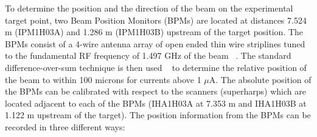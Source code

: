 {To determine the position and the direction of the beam on the experimental 
target point, two Beam Position Monitors (BPMs) are located at distances 7.524 m 
(IPM1H03A) and 1.286 m (IPM1H03B) upstream of the target position. 
The BPMs consist of a 4-wire antenna array of open ended thin wire striplines 
tuned to the fundamental RF frequency of 1.497 GHz of the beam ~\cite{bi:bar90}. The 
standard difference-over-sum technique is then used ~\cite{bi:HW} to determine the 
relative position of the beam to within 100 microns for currents
above 1 $\mu $A. The absolute  position of the BPMs can be calibrated with respect to the 
scanners (superharps) which are located adjacent to each of the BPMs (IHA1H03A 
at 7.353 m and IHA1H03B at 1.122 m upstream of the target). 
The position information from the 
BPMs can be recorded in three different ways:
}


